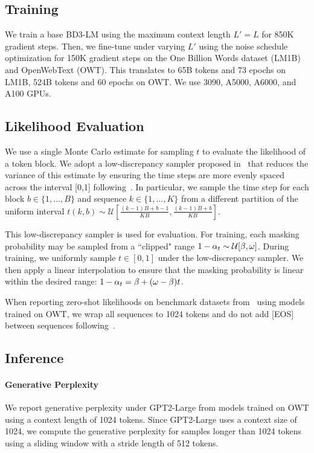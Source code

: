 \documentclass{article} %
\def\algo{BD3-LM}
\begin{document}
\subsection{Training}
\label{suppl:training}
We train a base \algo{} using the maximum context length $L'=L$ for 850K gradient steps. Then, we fine-tune under varying $L'$ using the noise schedule optimization for 150K gradient steps on the One Billion Words dataset (LM1B) and OpenWebText (OWT). This translates to 65B tokens and 73 epochs on LM1B, 524B tokens and 60 epochs on OWT. We use 3090, A5000, A6000, and A100 GPUs.

\subsection{Likelihood Evaluation}
We use a single Monte Carlo estimate for sampling $t$ to evaluate the likelihood of a token block. We adopt a low-discrepancy sampler proposed in~\citet{kingma2021variational} that reduces the variance of this estimate by ensuring the time steps are more evenly spaced across the interval [0,1] following~\cite{sahoo2024simple}. In particular, we sample the time step for each block $b \in \{1, \dots, B\}$ and sequence $k \in \{1, \dots, K\}$ from a different partition of the uniform interval $t(k, b) \sim \mathcal{U}[ \frac{(k-1)B + b - 1}{KB}, \frac{(k-1)B + b}{KB} ]$. 

This low-discrepancy sampler is used for evaluation. For training, each masking probability may be sampled from a ``clipped" range $1 - \alpha_{t} \sim \mathcal{U}[\beta, \omega]$. During training, we uniformly sample $t \in [0, 1]$ under the low-discrepancy sampler. We then apply a linear interpolation to ensure that the masking probability is linear within the desired range: $1 - \alpha_{t} = \beta + (\omega - \beta) t$.

When reporting zero-shot likelihoods on benchmark datasets from~\citet{radford2019language} using models trained on OWT, we wrap all sequences to 1024 tokens and do not add [EOS] between sequences following~\citet{sahoo2024simple}.

\subsection{Inference}
\label{suppl:eval-details}
    \paragraph{Generative Perplexity}
    We report generative perplexity under GPT2-Large from models trained on OWT using a context length of 1024 tokens. Since GPT2-Large uses a context size of 1024, we compute the generative perplexity for samples longer than 1024 tokens using a sliding window with a stride length of 512 tokens. 
\end{document}
